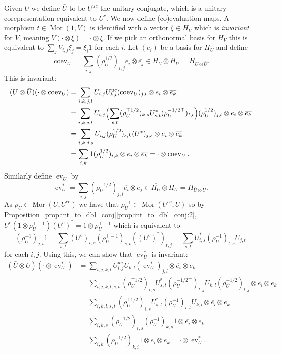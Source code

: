 \documentclass[a4paper,11pt]{article}
\theoremstyle{plain}
\theoremstyle{remark}
\newcommand{\ev}{\operatorname{ev}}
\newcommand{\coev}{\operatorname{coev}}
\newcommand{\conj}[1]{\bar{#1}}
\newcommand{\mor}{\operatorname{Mor}}
\begin{document}
Given $U$ we define $\conj U$ to be $U^{uc}$ the unitary conjugate, which is a unitary corepresentation equivalent to $U^c$.  We now define (co)evaluation maps.  A morphism $t\in\mor(1,V)$ is identified with a vector $\xi \in H_V$ which is \emph{invariant} for $V$, meaning $V(\cdot\otimes\xi) = \cdot\otimes\xi$.  If we pick an orthonormal basis for $H_V$ this is equivalent to $\sum_j V_{i,j} \xi_j = \xi_i 1$ for each $i$.  Let $(e_i)$ be a basis for $H_U$ and define
\[ \coev_U = \sum_{i,j} (\rho_U^{1/2})_{i,j} e_i \otimes \overline{e_j} \in H_U \otimes \overline{H_U} = H_{U\otimes\conj U}. \]
This is invariant:
\begin{align*}
(U\otimes \conj U)(\cdot\otimes\coev_U)
&= \sum_{i,k,j,l} U_{i,j} U^{uc}_{k,l}(\coev_U)_{j,l} \otimes e_i \otimes \overline{e_k} \\
&= \sum_{i,k,j,l} U_{i,j} \Bigl( \sum_{s,t} (\rho_U^{\top 1/2})_{k,s} U^*_{s,t} (\rho_U^{-1/2\top})_{t,l} \Bigr)  (\rho_U^{1/2})_{j,l} \otimes e_i \otimes \overline{e_k} \\
&= \sum_{i,k,j,s} U_{i,j} (\rho_U^{1/2})_{s,k} (U^*)_{j,s} \otimes e_i \otimes \overline{e_k} \\
&= \sum_{i,k} 1 (\rho_U^{1/2})_{i,k} \otimes e_i \otimes \overline{e_k} = \cdot\otimes\coev_U.
\end{align*}
Similarly define $\ev_U$ by
\[ \ev_U^* = \sum_{i,j} (\rho_U^{-1/2})_{j,i} \overline{e_i} \otimes e_j \in \overline{H_U}\otimes H_U = H_{\conj U\otimes U}. \]
As $\rho_U \in \mor(U,U^{cc})$ we have that $\rho_U^{-1} \in \mor(U^{cc},U)$ so by Proposition~\ref{prop:int_to_dbl_conj}\ref{prop:int_to_dbl_conj:2}, $U^c (1\otimes\rho_U^{\top-1}) (U^c)^* = 1\otimes\rho_U^{\top-1}$ which is equivalent to
\[ (\rho_U^{-1})_{j,i} 1
= \sum_{s,t} (U^c)_{i,s} (\rho_U^{\top-1})_{s,t} ((U^c)^*)_{t,j}
= \sum_{s,t} U^*_{i,s} (\rho_U^{-1})_{t,s} U_{j,t} \]
for each $i,j$.  Using this, we can show that $\ev_U^*$ is invariant:
\begin{align*}
(\conj U \otimes U)(\cdot \otimes \ev_U^*)
&= \sum_{i,j,k,l} U^{uc}_{i,j} U_{k,l} (\ev^*_U)_{j,l} \otimes \overline{e_i} \otimes e_k \\
&= \sum_{i,j,k,l,s,t} (\rho_U^{\top 1/2})_{i,s} U^*_{s,t} (\rho_U^{-1/2\top})_{t,j}  U_{k,l} (\rho_U^{-1/2})_{l,j} \otimes \overline{e_i} \otimes e_k \\
&= \sum_{i,k,l,s,t} (\rho_U^{\top 1/2})_{i,s} U^*_{s,t} (\rho_U^{-1})_{l,t} U_{k,l} \otimes \overline{e_i} \otimes e_k \\
&= \sum_{i,k,s} (\rho_U^{\top 1/2})_{i,s} (\rho_U^{-1})_{k,s}1 \otimes \overline{e_i} \otimes e_k  \\
&= \sum_{i,k} (\rho_U^{-1/2})_{k,i}1 \otimes \overline{e_i} \otimes e_k
= \cdot \otimes \ev_U^*.
\end{align*}
\end{document}
